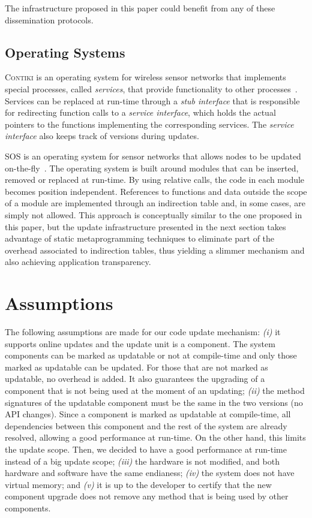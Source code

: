 \documentclass[10pt]{sigplanconf}
\begin{document}
The infrastructure proposed in this 
paper could benefit from any of these dissemination protocols.

\subsection{Operating Systems}

\textsc{Contiki} is an operating system for wireless sensor networks
that implements special processes, called \emph{services}, that
provide functionality to other processes~\cite{dunkels04contiki}.
Services can be replaced at run-time through a \emph{stub interface}
that is responsible for redirecting function calls to a \emph{service
  interface}, which holds the actual pointers to the functions
implementing the corresponding services.  The \emph{service interface}
also keeps track of versions during updates.

\textsc{SOS} is an operating system for sensor networks that allows
nodes to be updated on-the-fly~\cite{sos}. The operating system is
built around modules that can be inserted, removed or replaced at
run-time. By using relative calls, the code in each module becomes
position independent.  References to functions and data outside the
scope of a module are implemented through an indirection table and, in
some cases, are simply not allowed. This approach is conceptually
similar to the one proposed in this paper, but the update
infrastructure presented in the next section takes advantage of static
metaprogramming techniques to eliminate part of the overhead
associated to indirection tables, thus yielding a slimmer mechanism
and also achieving application transparency.

\section{Assumptions}

The following assumptions are made for our code update mechanism: \textit{(i)} it supports online updates and the update unit is a component. The system components can be marked as updatable or not at compile-time and only those marked as updatable can be updated. For those that are not marked as updatable, no overhead is added. It also guarantees the upgrading of a component that is not being used at the moment of an updating; \textit{(ii)} the method signatures of the updatable component must be the same in the two versions (no API changes). Since a component is marked as updatable at compile-time, all dependencies between this component and the rest of the system are already resolved, allowing a good performance at run-time. On the other hand, this limits the update scope. Then, we decided to have a good performance at run-time instead of a big update scope; \textit{(iii)} the hardware is not modified, and both hardware and software have the same endianess; \textit{(iv)} the system does not have virtual memory; and \textit{(v)} it is up to the developer to certify that the new component upgrade does not remove any method that is being used by other components.
\end{document}
